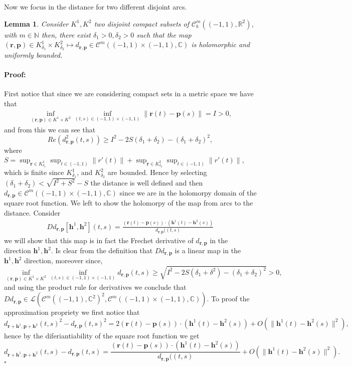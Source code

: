 \documentclass{article}
\newtheorem{lemma}[theorem]{Lemma}
\newenvironment{proof}{\paragraph{Proof:}}{\hfill$\square$}
\newcommand{\IC}{{\mathbb C}}
\newcommand{\IN}{{\mathbb N}}
\newcommand{\IR}{{\mathbb R}}
\newcommand{\bp}{{\bm p}}
\newcommand{\cmspace}[3]{\mathcal{C}^{#1} \left( #2, #3 \right)}
\newcommand{\rgeo}[1]{\mathcal{C}_b^{#1}\left( (-1,1), \IR^2 \right)}
\newcommand{\bh}{\bm{h}}
\newcommand{\br}{\bm{r}}
\begin{document}
Now we focus in the distance for two different disjoint arcs. 
\begin{lemma}
\label{lemma:dcross}
Consider $K^1,K^2$ two disjoint compact subsets of $\rgeo{m}$, with  $m \in \IN$
then, there exist $\delta_1 >0 , \delta_2 >0$ such that the map $(\br, \bp) \in K^1_{\delta_1} \times K^2_{\delta_2} \mapsto d_{\br, \bp} \in \cmspace{m}{(-1,1)\times(-1,1)}{\IC}$ is holomorphic and uniformly bounded. 
\end{lemma}
\begin{proof}
First notice that since we are considering compact sets in a metric space we have that
\begin{align*}
\inf_{(\br,\bp) \in K^1 \times K^2} \inf_{(t,s) \in (-1,1)\times(-1,1)}
 \| \br(t) - \bp(s) \| = I > 0,
\end{align*}
and from this we can see that
$$
Re(d_{\br,\bp}^2(t,s)) \geq I^2 -2 S(\delta_1 + \delta_2) - ( \delta_1 + \delta_2)^2,$$
where $S = \sup_{\br \in K^1_{\delta_1}} \sup_{t \in (-1,1)} \| r'(t)\| +
\sup_{\br \in K^2_{\delta_2}} \sup_{t \in (-1,1)} \| r'(t)\|$, which is finite since $K^1_{\delta_1}$, and $K^2_{\delta_2}$ are bounded. Hence by selecting $(\delta_1+\delta_2) < \sqrt{I^2+S^2}-S$ the distance is well defined and then $d_{\br, \bp } \in \cmspace{m}{(-1,1)\times (-1,1)}{\IC}$ since we are in the holomorpy domain of the square root function. We left to show the holomorpy of the map from arcs to the distance. Consider 
\begin{align*}
D d_{\br,\bp}[\bh^1,\bh^2](t,s) = \frac{(\br(t) -\bp(s))\cdot(\bh^1(t)- \bh^2(s))}{d_{\br,\bp}((t,s)} 
\end{align*}
we will show that this map is in fact the Frechet derivative of $d_{\br,\bp}$ in the direction $\bh^1,\bh^2$. Is clear from the definition that $D d_{\br,\bp}$ is a linear map in the $\bh^1,\bh^2$ direction, moreover since, 
$$\inf_{(\br,\bp) \in K^1 \times K^2} \inf_{(t,s) \in (-1,1)\times(-1,1)}
d_{\br,\bp}(t,s) \geq \sqrt{I^2 -2S (\delta_1 +\delta^2)-(\delta_1 +\delta_2)^2}>0,$$
and using the product rule for derivatives we conclude that $D d_{\br,\bp}\in \mathcal{L}(\cmspace{m}{(-1,1)}{\IC^2}^2,
\cmspace{m}{(-1,1) \times (-1,1)}{\IC})$. To proof the approximation propriety we first notice that 
$$d_{\br+ \bh^1, \bp+\bh^2}(t,s)^2 - d_{\br,\bp}(t,s)^2 = 2 (\br(t)-\bp(s))\cdot (\bh^1(t)- \bh^2(s)) + O(\| \bh^1(t)- \bh^2(s)\|^2),$$
hence by the diferiantiability of the square root function we get 
$$
d_{\br+ \bh^1, \bp+\bh^2}(t,s) - d_{\br,\bp}(t,s) = \frac{(\br(t) -\bp(s))\cdot(\bh^1(t)- \bh^2(s))}{d_{\br,\bp}((t,s)}  + O( \| \bh^1(t)- \bh^2(s)\|^2).
$$
\end{proof}
\end{document}
